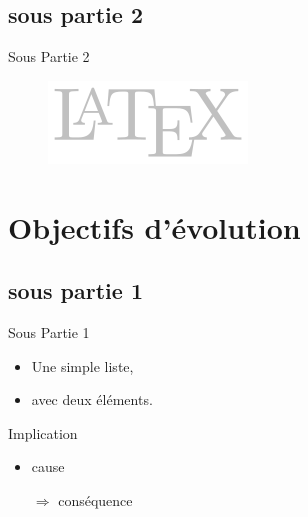 \documentclass[utf8,compress]{beamer}
\begin{document}
%
\subsection{sous partie 2}
\begin{frame}{Sous Partie 2}
    \begin{figure}[h]
        \center
        \includegraphics[width=\textwidth]{image.png}
    \end{figure}
\end{frame}



\section{Objectifs d'évolution}

%
\subsection{sous partie 1}
\begin{frame}{Sous Partie 1}
    \begin{itemize}
        \item Une simple liste,
        \item avec deux éléments.
    \end{itemize}
    \begin{block}{Implication}
        \begin{itemize}
        \item cause
        \item[$\Rightarrow$] conséquence
        \end{itemize}
    \end{block}
\end{frame}

%
\end{document}

